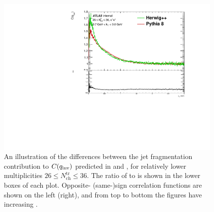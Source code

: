 \begin{figure}[t]
\begin{minipage}[t]{1.0\textwidth}
\includegraphics[width=.49\linewidth]{herwigPythiaCompCent7_e1_kt6.pdf}
\end{minipage}
\caption{An illustration of the differences between the jet fragmentation contribution to $C(q_{\mathrm{inv}})$ predicted in \Herwig and \PYEight, for relatively lower multiplicities $26 \leq N_\mathrm{ch}^\mathrm{tr} \leq 36$. The ratio of \Herwig to \Pythia is shown in the lower boxes of each plot. Opposite- (same-)sign correlation functions are shown on the left (right), and from top to bottom the figures have increasing \kt.}
\label{fig:comp_herwig_pythia_cent7}
\end{figure}

